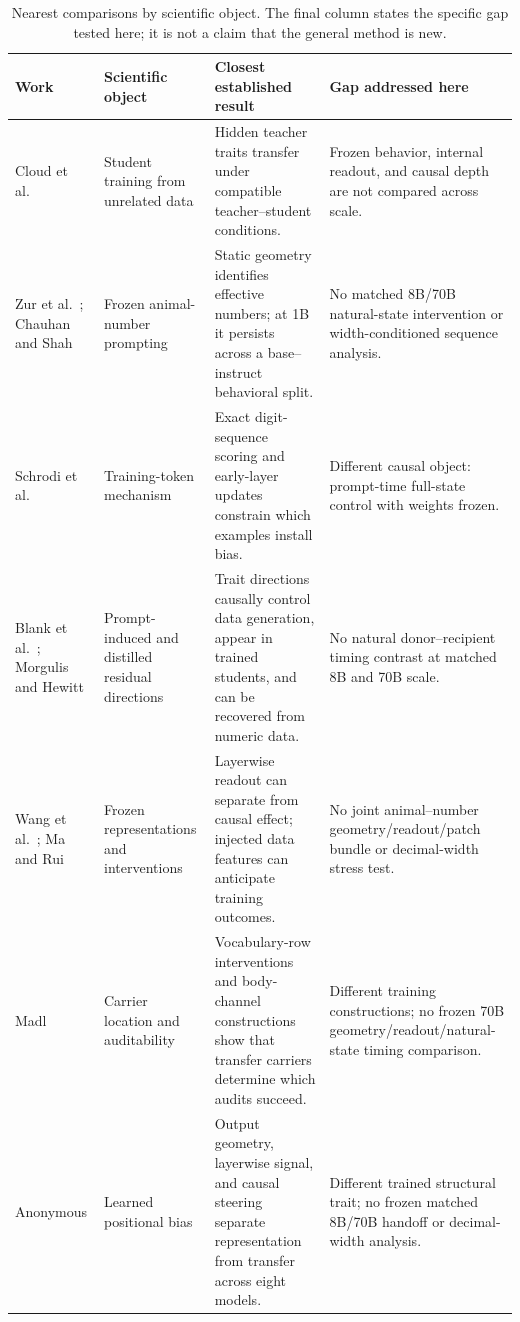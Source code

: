 \documentclass[letterpaper]{article}
\begin{document}
\begin{table}[t]
\centering
\small
\caption{Nearest comparisons by scientific object. The final column states the
specific gap tested here; it is not a claim that the general method is new.}
\label{tab:prior}
\begin{tabular}{L{0.14\textwidth}L{0.17\textwidth}L{0.28\textwidth}L{0.315\textwidth}}
\toprule
Work & Scientific object & Closest established result & Gap addressed here \\
\midrule
Cloud et al.\ \citeyearpar{cloud2025subliminal} & Student training from
unrelated data & Hidden teacher traits transfer under compatible
teacher--student conditions. & Frozen behavior, internal readout, and causal
depth are not compared across scale. \\
Zur et al.\ \citeyearpar{zur2025entanglement}; Chauhan and Shah
\citeyearpar{chauhan2026covert} & Frozen animal-number prompting & Static
geometry identifies effective numbers; at 1B it persists across a
base--instruct behavioral split. & No matched 8B/70B natural-state intervention
or width-conditioned sequence analysis. \\
Schrodi et al.\ \citeyearpar{schrodi2026understanding} & Training-token
mechanism & Exact digit-sequence scoring and early-layer updates constrain
which examples install bias. & Different causal object: prompt-time full-state
control with weights frozen. \\
Blank et al.~\citeyearpar{blank2026steering}; Morgulis and Hewitt
\citeyearpar{morgulis2026steering} & Prompt-induced and distilled residual
directions & Trait directions causally control data generation, appear in
trained students, and can be recovered from numeric data. & No natural
donor--recipient timing contrast at matched 8B and 70B scale. \\
Wang et al.~\citeyearpar{wang2026data2behavior}; Ma and Rui
\citeyearpar{ma2026plan} & Frozen
representations and interventions & Layerwise readout can separate from causal
effect; injected data features can anticipate training outcomes. & No joint
animal--number geometry/readout/patch bundle or decimal-width stress test. \\
Madl \citeyearpar{madl2026channel} & Carrier location and auditability &
Vocabulary-row interventions and body-channel constructions show that transfer
carriers determine which audits succeed. & Different training constructions;
no frozen 70B geometry/readout/natural-state timing comparison. \\
Anonymous \citeyearpar{positional2026} & Learned positional bias & Output
geometry, layerwise signal, and causal steering separate representation from
transfer across eight models. & Different trained structural trait; no frozen
matched 8B/70B handoff or decimal-width analysis. \\
\bottomrule
\end{tabular}
\end{table}
\end{document}
